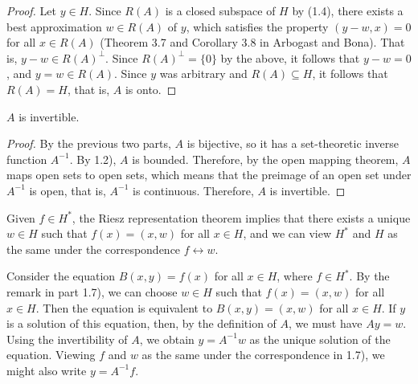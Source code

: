 \documentclass{homework}
\begin{document}
\begin{arabicparts}
\begin{proof}
			Let $y \in H$. Since $R(A)$ is a closed subspace of $H$ by (1.4), there exists a best approximation $w \in R(A)$ of $y$, which satisfies the property $(y - w, x) = 0$ for all $x \in R(A)$ (Theorem 3.7 and Corollary 3.8 in Arbogast and Bona). That is, $y-w \in R(A)^\perp$. Since $R(A)^\perp =\{0\}$ by the above, it follows that $y-w = 0$, and $y=w \in R(A)$. Since $y$ was arbitrary and $R(A) \subseteq H$, it follows that $R(A) = H$, that is, $A$  is onto.
		\end{proof}
		
		\questionpart
		$A$ is invertible.
		\begin{proof}
			By the previous two parts, $A$ is bijective, so it has a set-theoretic inverse function $A^{-1}$. By 1.2), $A$ is bounded. Therefore, by the open mapping theorem, $A$ maps open sets to open sets, which means that the preimage of an open set under $A^{-1}$ is open, that is, $A^{-1}$ is continuous. Therefore, $A$ is invertible.
		\end{proof}
		
		\questionpart
		Given $f \in H^{*}$, the Riesz representation theorem implies that there exists a unique $w \in H$ such that $f(x) = (x,w)$ for all $x \in H$, and we can view $H^{*}$ and $H$ as the same under the correspondence $f \leftrightarrow w$.
		
		\questionpart
		Consider the equation $B(x,y) = f(x)$ for all $x \in H$, where $f \in H^{*}$. By the remark in part 1.7), we can choose $w \in H$ such that $f(x) = (x,w)$ for all $x \in H$. Then the equation is equivalent to $B(x,y) = (x,w)$ for all $x \in H$. If $y$ is a solution of this equation, then, by the definition of $A$, we must have $Ay = w$. Using the invertibility of $A$, we obtain $y = A^{-1}w$ as the unique solution of the equation. Viewing $f$ and $w$ as the same under the correspondence in 1.7), we might also write $y = A^{-1}f$.
	\end{arabicparts}
	
\end{document}
